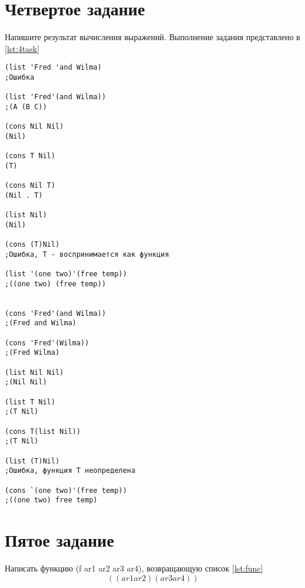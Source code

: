 \section{ Четвертое задание}
Напишите результат вычисления выражений. Выполнение задания представлено в \ref{lst:4task}
\begin{lstlisting}[style=lispStyle, caption={Выражения и их результат},
                label={lst:4task}]
(list 'Fred 'and Wilma)
;Ошибка

(list 'Fred'(and Wilma))
;(A (B C))

(cons Nil Nil)
(Nil)

(cons T Nil)
(T)

(cons Nil T)
(Nil . T)

(list Nil)
(Nil)

(cons (T)Nil)
;Ошибка, T - воспринимается как функция

(list '(one two)'(free temp))
;((one two) (free temp))


(cons 'Fred'(and Wilma))
;(Fred and Wilma)

(cons 'Fred'(Wilma))
;(Fred Wilma)

(list Nil Nil)
;(Nil Nil)

(list T Nil)
;(T Nil)

(cons T(list Nil))
;(T Nil)

(list (T)Nil)
;Ошибка, функция T неопределена

(cons `(one two)'(free temp))
;((one two) free temp)
\end{lstlisting}

\section{ Пятое задание}
Написать функцию (f ar1 ar2 ar3 ar4), возвращающую список \ref{lst:func}
\begin{equation}
\label{lst:func}
((ar1 ar2)(ar3 ar4))
\end{equation}
